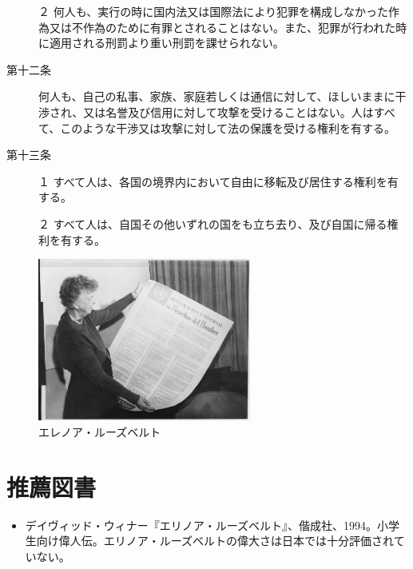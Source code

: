 \begin{description}
\noindent{}２ 何人も、実行の時に国内法又は国際法により犯罪を構成しなかった作為又は不作為のために有罪とされることはない。また、犯罪が行われた時に適用される刑罰より重い刑罰を課せられない。

\item[第十二条]



何人も、自己の私事、家族、家庭若しくは通信に対して、ほしいままに干渉され、又は名誉及び信用に対して攻撃を受けることはない。人はすべて、このような干渉又は攻撃に対して法の保護を受ける権利を有する。

\item[第十三条]


\noindent{}１ すべて人は、各国の境界内において自由に移転及び居住する権利を有する。


\noindent{}２ すべて人は、自国その他いずれの国をも立ち去り、及び自国に帰る権利を有する。

\end{description}



 \begin{figure}[htbp]
   \centering
      \includegraphics[width=70mm]{images/eleanor.jpg}
   \caption{エレノア・ルーズベルト}
 \end{figure}




\section{推薦図書}


\begin{itemize}
\item デイヴィッド・ウィナー『エリノア・ルーズベルト』、偕成社、1994。小学生向け偉人伝。エリノア・ルーズベルトの偉大さは日本では十分評価されていない。
\end{itemize}








